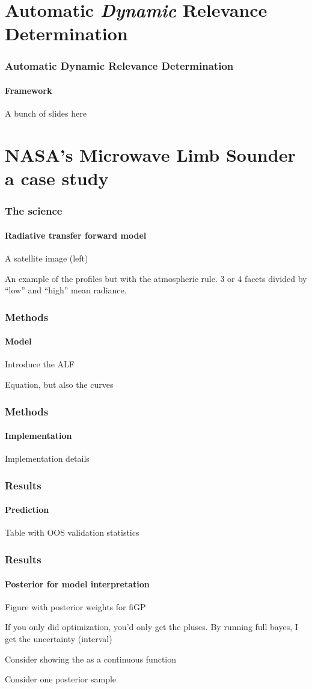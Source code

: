 \documentclass{snedecorbeamer}
\begin{document}
\section{Automatic \textit{Dynamic} Relevance Determination}

\begin{frame}
  \frametitle{Automatic Dynamic Relevance Determination}
  \framesubtitle{Framework}

  A bunch of slides here
\end{frame}

\section{NASA's Microwave Limb Sounder \\ {\small a case study}}

\begin{frame}
  \frametitle{The science}
  \framesubtitle{Radiative transfer forward model }

  A satellite image (left)

  An example of the profiles but with the atmospheric rule. 3 or 4 facets
  divided by ``low'' and ``high'' mean radiance.
\end{frame}

\begin{frame}
  \frametitle{Methods}
  \framesubtitle{Model}

  Introduce the ALF

  Equation, but also the curves
\end{frame}

\begin{frame}
  \frametitle{Methods}
  \framesubtitle{Implementation}

  Implementation details
\end{frame}

\begin{frame}
  \frametitle{Results}
  \framesubtitle{Prediction}

  Table with OOS validation statistics
\end{frame}

\begin{frame}
  \frametitle{Results}
  \framesubtitle{Posterior for model interpretation}

  Figure with posterior weights for fiGP

  If you only did optimization, you'd only get the pluses. By running full
  bayes, I get the uncertainty (interval)

  Consider showing the as a continuous function

  Consider one posterior sample
\end{frame}
\end{document}

